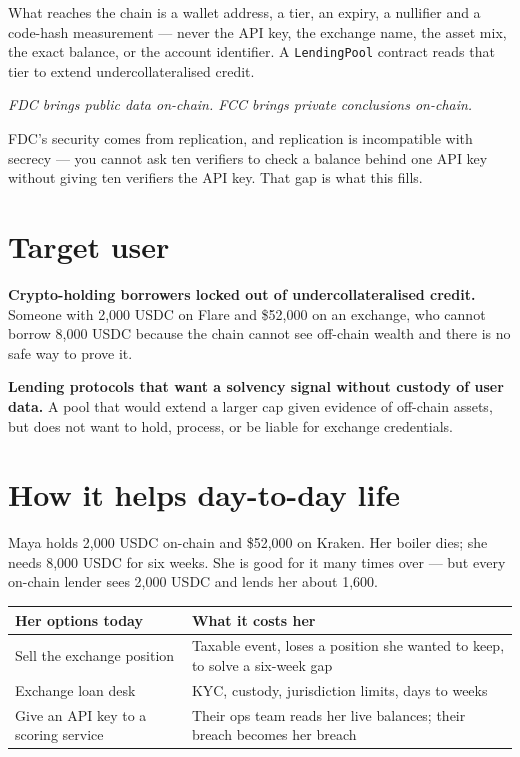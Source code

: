\documentclass[11pt,a4paper]{article}
\newcommand{\code}[1]{\texttt{\small #1}}
\newcommand{\keyline}[1]{%
  \begin{center}\itshape #1\end{center}}
\begin{document}
What reaches the chain is a wallet address, a tier, an expiry, a nullifier and
a code-hash measurement --- never the API key, the exchange name, the asset
mix, the exact balance, or the account identifier. A \code{LendingPool}
contract reads that tier to extend undercollateralised credit.

\keyline{FDC brings public data on-chain. FCC brings private conclusions on-chain.}

FDC's security comes from replication, and replication is incompatible with
secrecy --- you cannot ask ten verifiers to check a balance behind one API key
without giving ten verifiers the API key. That gap is what this fills.

\section{Target user}

\textbf{Crypto-holding borrowers locked out of undercollateralised credit.}
Someone with 2,000 USDC on Flare and \$52,000 on an exchange, who cannot borrow
8,000 USDC because the chain cannot see off-chain wealth and there is no safe
way to prove it.

\textbf{Lending protocols that want a solvency signal without custody of user
data.} A pool that would extend a larger cap given evidence of off-chain
assets, but does not want to hold, process, or be liable for exchange
credentials.

\section{How it helps day-to-day life}

Maya holds 2,000 USDC on-chain and \$52,000 on Kraken. Her boiler dies; she
needs 8,000 USDC for six weeks. She is good for it many times over --- but
every on-chain lender sees 2,000 USDC and lends her about 1,600.

\begin{tabularx}{\textwidth}{@{}l L@{}}
  \toprule
  \textbf{Her options today} & \textbf{What it costs her} \\
  \midrule
  Sell the exchange position
    & Taxable event, loses a position she wanted to keep, to solve a six-week gap \\
  \addlinespace
  Exchange loan desk
    & KYC, custody, jurisdiction limits, days to weeks \\
  \addlinespace
  Give an API key to a scoring service
    & Their ops team reads her live balances; their breach becomes her breach \\
  \bottomrule
\end{tabularx}
\end{document}
